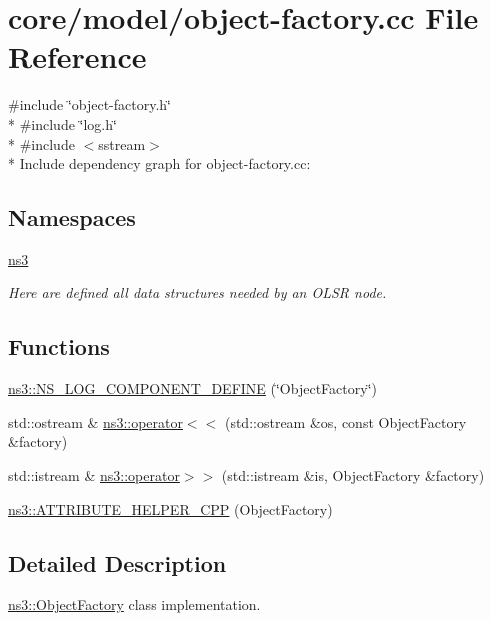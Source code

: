 \hypertarget{object-factory_8cc}{}\section{core/model/object-\/factory.cc File Reference}
\label{object-factory_8cc}
{\ttfamily \#include \char`\"{}object-\/factory.\+h\char`\"{}}\\*
{\ttfamily \#include \char`\"{}log.\+h\char`\"{}}\\*
{\ttfamily \#include $<$sstream$>$}\\*
Include dependency graph for object-\/factory.cc\+:
\subsection*{Namespaces}
\begin{DoxyCompactItemize}
\item 
 \hyperlink{namespacens3}{ns3}
\begin{DoxyCompactList}\small\item\em Here are defined all data structures needed by an O\+L\+SR node. \end{DoxyCompactList}\end{DoxyCompactItemize}
\subsection*{Functions}
\begin{DoxyCompactItemize}
\item 
\hyperlink{namespacens3_a2f0d4704147799a88ebe1396a6babc5f}{ns3\+::\+N\+S\+\_\+\+L\+O\+G\+\_\+\+C\+O\+M\+P\+O\+N\+E\+N\+T\+\_\+\+D\+E\+F\+I\+NE} (\char`\"{}Object\+Factory\char`\"{})
\item 
std\+::ostream \& \hyperlink{namespacens3_ae59476fec2f033f40e25e806cb762d3f}{ns3\+::operator$<$$<$} (std\+::ostream \&os, const Object\+Factory \&factory)
\item 
std\+::istream \& \hyperlink{namespacens3_a53802b18fd9fc0a909aaa0753a8633b5}{ns3\+::operator$>$$>$} (std\+::istream \&is, Object\+Factory \&factory)
\item 
\hyperlink{namespacens3_a52f9a730cf815268f2a2ee1a33788e11}{ns3\+::\+A\+T\+T\+R\+I\+B\+U\+T\+E\+\_\+\+H\+E\+L\+P\+E\+R\+\_\+\+C\+PP} (Object\+Factory)
\end{DoxyCompactItemize}


\subsection{Detailed Description}
\hyperlink{classns3_1_1ObjectFactory}{ns3\+::\+Object\+Factory} class implementation. 